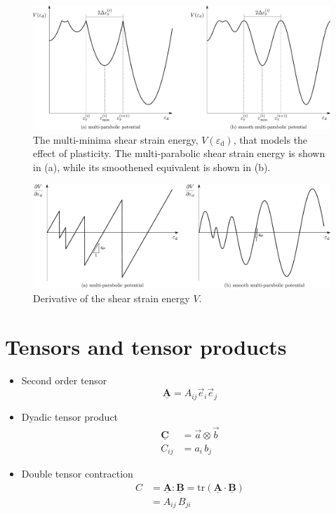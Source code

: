 \documentclass[times,namecite]{goose-article}
\newcommand\T[1]{\underline{\bm{{#1}}}}
\begin{document}
\begin{figure}[htp]
  \centering
  \includegraphics[width=1.\textwidth]{figures/potential_V-plas}
  \caption{The multi-minima shear strain energy, $V ( \varepsilon_\mathrm{d} )$, that models the effect of plasticity. The multi-parabolic shear strain energy is shown in (a), while its smoothened equivalent is shown in (b).}
  \label{fig:V:plas}
\end{figure}

\begin{figure}[htp]
  \centering
  \includegraphics[width=1.\textwidth]{figures/potential_dV-plas}
  \caption{Derivative of the shear strain energy $V$.}
  \label{fig:dV:plas}
\end{figure}

\appendix

\vfill\newpage
\section{Tensors and tensor products}
\label{sec:nomenclature:tensor}

\begin{itemize}
%
\item Second order tensor
\begin{equation}
  \T{A} = A_{ij} \vec{e}_i \vec{e}_j
\end{equation}
%
\item Dyadic tensor product
\begin{align}
  \T{C} &= \vec{a} \otimes \vec{b} \\
  C_{ij} &= a_{i} \, b_{j}
\end{align}
%
\item Double tensor contraction
\begin{align}
  C &= \T{A} : \T{B} = \mathrm{tr} \left( \T{A} \cdot \T{B} \right) \\
    &= A_{ij} \, B_{ji}
\end{align}
%
\end{itemize}
\end{document}
